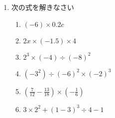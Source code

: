 \documentclass[twocolumn, fleqn]{jsarticle}
\begin{document}
\begin{enumerate}
  \item 次の式を解きなさい

      \begin{enumerate}
        \item  $(-6) \times 0.2c$
          \vfill
        \item  $2x \times(-1.5) \times 4$
          \vfill
        \item  $2^3 \times (-4) \div (-8)^2$
          \vfill
        \item $(-3^2) \div(-6)^2 \times (-2)^3$
          \vfill
        \item $(\frac{7}{12}-\frac{13}{18}) \times (- \frac{1}{6})$
          \vfill
          \newpage

      \item $3 \times 2^2 +(1-3)^3 \div 4 -1$
          \vfill
      \end{enumerate}

  \end{enumerate}
\end{document}
